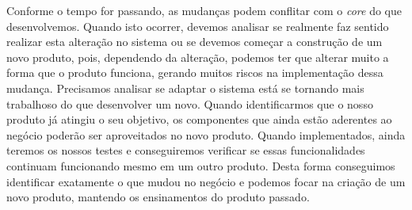       Conforme o tempo for passando, as mudanças podem conflitar com o \textit{core}
      do que desenvolvemos. Quando isto ocorrer, devemos analisar se realmente faz
      sentido realizar esta alteração no sistema ou se devemos começar a construção
      de um novo produto, pois, dependendo da alteração, podemos ter que alterar muito
      a forma que o produto funciona, gerando muitos riscos na implementação dessa
      mudança. Precisamos analisar se adaptar o sistema está se tornando mais trabalhoso
      do que desenvolver um novo. Quando identificarmos que o nosso produto já
      atingiu o seu objetivo, os componentes que ainda estão aderentes ao negócio
      poderão ser aproveitados no novo produto. Quando implementados, ainda teremos
      os nossos testes e conseguiremos verificar se essas funcionalidades continuam
      funcionando mesmo em um outro produto. Desta forma conseguimos identificar
      exatamente o que mudou no negócio e podemos focar na criação de um novo
      produto, mantendo os ensinamentos do produto passado.

